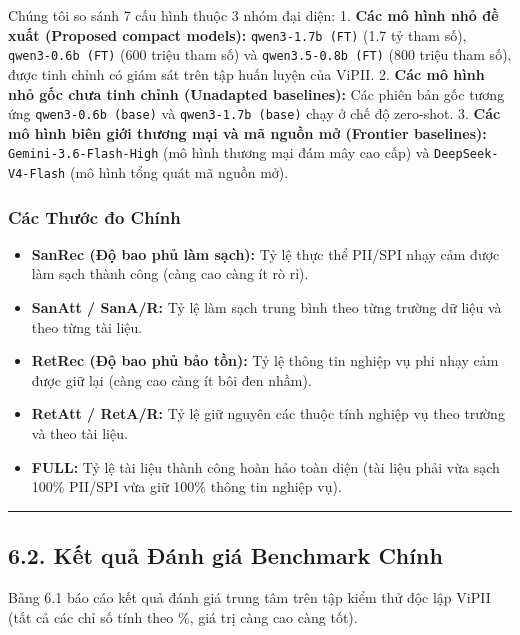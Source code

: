 \documentclass[
  11pt,
  a4paper,
]{article}
\providecommand{\tightlist}{%
  \setlength{\itemsep}{0pt}\setlength{\parskip}{0pt}}
\begin{document}
Chúng tôi so sánh 7 cấu hình thuộc 3 nhóm đại diện: 1. \textbf{Các mô hình nhỏ đề xuất (Proposed
compact models):} \texttt{qwen3-1.7b\ (FT)} (1.7 tỷ tham số), \texttt{qwen3-0.6b\ (FT)} (600 triệu
tham số) và \texttt{qwen3.5-0.8b\ (FT)} (800 triệu tham số), được tinh chỉnh có giám sát trên tập
huấn luyện của ViPII. 2. \textbf{Các mô hình nhỏ gốc chưa tinh chỉnh (Unadapted baselines):} Các
phiên bản gốc tương ứng \texttt{qwen3-0.6b\ (base)} và \texttt{qwen3-1.7b\ (base)} chạy ở chế độ
zero-shot. 3. \textbf{Các mô hình biên giới thương mại và mã nguồn mở (Frontier baselines):}
\texttt{Gemini-3.6-Flash-High} (mô hình thương mại đám mây cao cấp) và \texttt{DeepSeek-V4-Flash}
(mô hình tổng quát mã nguồn mở).

\subsubsection{Các Thước đo Chính}\label{cuxe1c-thux1b0ux1edbc-ux111o-chuxednh}

\begin{itemize}
\tightlist
\item
  \textbf{SanRec (Độ bao phủ làm sạch):} Tỷ lệ thực thể PII/SPI nhạy cảm được làm sạch thành công
  (càng cao càng ít rò rỉ).
\item
  \textbf{SanAtt / SanA/R:} Tỷ lệ làm sạch trung bình theo từng trường dữ liệu và theo từng tài
  liệu.
\item
  \textbf{RetRec (Độ bao phủ bảo tồn):} Tỷ lệ thông tin nghiệp vụ phi nhạy cảm được giữ lại (càng
  cao càng ít bôi đen nhầm).
\item
  \textbf{RetAtt / RetA/R:} Tỷ lệ giữ nguyên các thuộc tính nghiệp vụ theo trường và theo tài liệu.
\item
  \textbf{FULL:} Tỷ lệ tài liệu thành công hoàn hảo toàn diện (tài liệu phải vừa sạch 100\% PII/SPI
  vừa giữ 100\% thông tin nghiệp vụ).
\end{itemize}

\begin{center}\rule{0.5\linewidth}{0.5pt}\end{center}

\subsection{6.2. Kết quả Đánh giá Benchmark
Chính}\label{kux1ebft-quux1ea3-ux111uxe1nh-giuxe1-benchmark-chuxednh}

Bảng 6.1 báo cáo kết quả đánh giá trung tâm trên tập kiểm thử độc lập ViPII (tất cả các chỉ số tính
theo \%, giá trị càng cao càng tốt).
\end{document}
